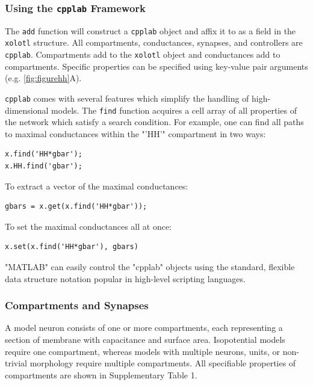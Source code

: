 \documentclass{frontiersSCNS} %
\begin{document}
\subsubsection{Using the \texttt{cpplab} Framework}

The \texttt{add} function will construct a \texttt{cpplab} object and affix it to as a field in the \texttt{xolotl} structure. All compartments, conductances, synapses, and controllers are \texttt{cpplab}. Compartments add to the \texttt{xolotl} object and conductances add to compartments. Specific properties can be specified using key-value pair arguments (e.g. \ref{fig:figurehh}A).

\texttt{cpplab} comes with several features which simplify the handling of high-dimensional models. The \texttt{find} function acquires a cell array of all properties of the network which satisfy a search condition. For example, one can find all paths to maximal conductances within the "'HH'" compartment in two ways:

\begin{lstlisting}[style=Matlab-editor]
x.find('HH*gbar');
x.HH.find('gbar');
\end{lstlisting}

To extract a vector of the maximal conductances:

\begin{lstlisting}[style=Matlab-editor]
gbars = x.get(x.find('HH*gbar'));
\end{lstlisting}

To set the maximal conductances all at once:

\begin{lstlisting}[style=Matlab-editor]
x.set(x.find('HH*gbar'), gbars)
\end{lstlisting}

"MATLAB" can easily control the "cpplab" objects using the standard, flexible data structure notation popular in high-level scripting languages.

\subsubsection{Compartments and Synapses}

A model neuron consists of one or more compartments, each representing a section of membrane with capacitance and surface area. Isopotential models require one compartment, whereas models with multiple neurons, units, or non-trivial morphology require multiple compartments. All specifiable properties of compartments are shown in Supplementary Table 1.
\end{document}
